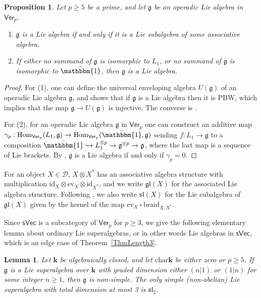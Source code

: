 \documentclass[11pt,a4paper,reqno]{amsart}
\newtheorem{lemma}[theorem]{Lemma}
\newtheorem{prop}[theorem]{Proposition}
\theoremstyle{definition}
\newcommand{\bk}{\mathbf{k}}
\newcommand{\cD}{\mathcal{D}}
\numberwithin{equation}{section}
\newcommand{\ev}{\mathrm{ev}}
\newcommand{\braid}{\mathrm{braid}}
\newcommand{\charr}{\mathrm{char}}
\newcommand{\Ver}{\mathsf{Ver}}
\newcommand{\unit}{{\mathbbm{1}}}
\newcommand{\fg}{\mathfrak{g}}
\newcommand{\fsl}{\mathfrak{sl}}
\newcommand{\fgl}{\mathfrak{gl}}
\newcommand{\Hom}{\mathrm{Hom}}
\newcommand{\id}{\mathrm{id}}
\newcommand{\sVec}{\mathsf{sVec}}
\begin{document}
\begin{prop}\label{PropNoL1}
Let $p\geq5$ be a prime, and let $\fg$ be an operadic Lie algebra in $\Ver_p$.
\begin{enumerate}
\item $\fg$ is a Lie algebra if and only if it is a Lie subalgebra of some associative algebra.
\item If either no summand of $\fg$ is isomorphic to $L_1$, or no summand of $\fg$ is isomorphic to $\bar\unit$, then $\fg$ is a Lie algebra.
\end{enumerate}
\end{prop}

\begin{proof}
For (1), one can define the universal enveloping algebra $U(\fg)$ of an operadic Lie algebra $\fg$, and \cite[Theorem~6.6]{Et} shows that if $\fg$ is a Lie algebra then it is PBW, which implies that the map $\fg\to U(\fg)$ is injective. The converse is \cite[Proposition~4.7]{Et}.

For (2), for an operadic Lie algebra $\fg$ in $\Ver_p$ one can construct an additive map $\gamma_p:\Hom_{\Ver_p}(L_1,\fg)\to\Hom_{\Ver_p}(\bar\unit,\fg)$ sending $f:L_1\to\fg$ to a composition $\bar\unit\hookrightarrow L_1^{\otimes p}\to\fg^{\otimes p}\to\fg$, where the last map is a sequence of Lie brackets. By \cite[Theorem~6.6]{Et}, $\fg$ is a Lie algebra if and only if $\gamma_p=0$.
\end{proof}

For an object $X\in\cD$, $X\otimes X^*$ has an associative algebra structure with multiplication $\id_X\otimes\ev_X\otimes\id_{X^*}$, and we write $\fgl(X)$ for the associated Lie algebra structure. Following \cite{Ve2}, we also write $\fsl(X)$ for the Lie subalgebra of $\fgl(X)$ given by the kernel of the map $\ev_X\circ\braid_{X,X^*}$.

Since $\sVec$ is a subcategory of $\Ver_p$ for $p\geq3$, we give the following elementary lemma about ordinary Lie superalgebras, or in other words Lie algebras in $\sVec$, which is an edge case of Theorem~\ref{ThmLength3}.

\begin{lemma}\label{LemLieSuper}
Let $\bk$ be algebraically closed, and let $\charr\bk$ be either zero or $p\geq5$. If $\fg$ is a Lie superalgebra over $\bk$ with graded dimension either $(n|1)$ or $(1|n)$ for some integer $n\geq1$, then $\fg$ is non-simple. The only simple (non-abelian) Lie superalgebra with total dimension at most 3 is $\fsl_2$.
\end{lemma}
\end{document}
